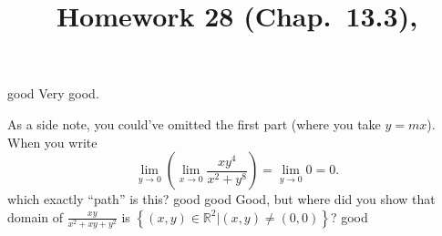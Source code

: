 \documentclass[10pt]{article} %
\title{Homework 28 (Chap.~13.3),
}
\begin{document}
\maketitle
{}
good
Very good. 

As a side note, you could've omitted the first part (where you take $y=mx$).
When you write
\begin{equation*}
	\lim_{y\to0}\left( \lim_{x\to0}\frac{xy^4}{x^2+y^8} \right)=\lim_{y\to0}0=0.
\end{equation*}
which exactly ``path'' is this?
good
good
Good, but where did you show that domain of $\frac{xy}{x^2+xy+y^2}$ is $\left\{ (x,y)\in\mathbb{R}^2\left|(x,y)\neq(0,0)\right. \right\}$?
good
\end{document}
